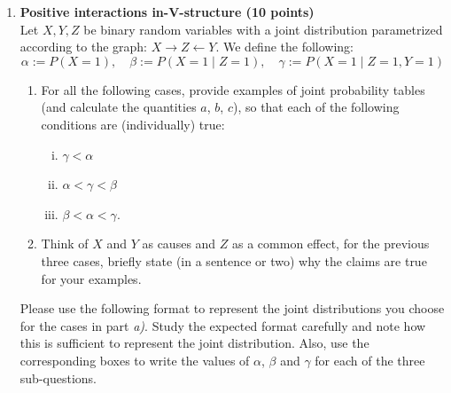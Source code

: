 \documentclass[12pt]{article}
\newcommand{\1}{{\bf 1}}
\begin{document}
\begin{enumerate}
\item {\bf Positive interactions in-V-structure (10 points) } \\
Let $X, Y, Z$ be binary random variables with a joint
distribution parametrized according to the graph: $X \rightarrow Z
\leftarrow Y$. We define the following: 
\begin{equation}
\alpha := P(X = 1), \quad \beta := P (X = 1 \mid Z = 1), \quad  \gamma := P (X = 1 \mid Z
= 1, Y = 1) \nonumber
\end{equation}
\begin{enumerate}
\item For all the following cases, provide examples of joint
probability tables (and calculate the quantities $a$, $b$, $c$),
so that each of the following conditions are (individually) true: 
\begin{enumerate}[(i)]
\item $\gamma < \alpha$
\item $\alpha < \gamma < \beta$
\item $\beta < \alpha < \gamma$.
\end{enumerate}


\item Think of $X$ and $Y$ as causes and $Z$ as a common effect, for the previous three cases, briefly state (in a sentence or two) why the claims are true for your examples.
\end{enumerate}

Please use the following format to represent the joint distributions you choose for the cases in part \textit{a)}. Study the expected format carefully and note how this is sufficient to represent the joint distribution. Also, use the corresponding boxes to write the values of $\alpha$, $\beta$ and $\gamma$ for each of the three sub-questions.

\begin{center}


\end{center}
\end{enumerate}
\end{document}
